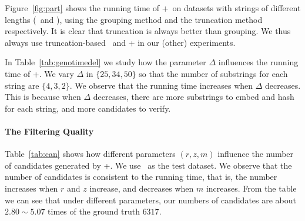 Figure~\ref{fig:part} shows the running time of \ebdjoin+\ on datasets with strings of different lengths (\uniref\ and \trec), using the grouping method and the truncation method respectively.  It is clear that truncation is always better than grouping.  
 We thus always use truncation-based \ebdjoin\ and \ebdjoin+ in our (other) experiments.  
 
 
In Table~\ref{tab:genotimedel} we study how the parameter $\Delta$ influences the running time of \ebdjoin+. We vary $\Delta$ in $\{25, 34, 50\}$ so that the number of substrings for each string are $\{4, 3, 2\}$. We observe that the running time increases when $\Delta$ decreases. This is because when $\Delta$ decreases, there are more substrings to embed and hash for each string, and more candidates to verify. 




\paragraph{The Filtering Quality}
Table~\ref{tab:can} shows how different parameters $(r, z, m)$ influence the number of candidates generated by \ebdjoin+.  We use \genoa\ as the test dataset.   We observe that the number of candidates is consistent to the running time, that is, the number increases when $r$ and $z$ increase, and decreases when $m$ increases.  From the table we can see that under different parameters, our numbers of candidates are about $2.80 \sim 5.07$ times of the ground truth $6317$. 

\begin{table*}[!ht]
\centering
{}
\caption{Number of candidate pairs after filtering of \ebdjoin+, \genoa\ dataset, $K=100, \Delta = 50$; ground truth is $6317$.}
\label{tab:can}
\end{table*}



